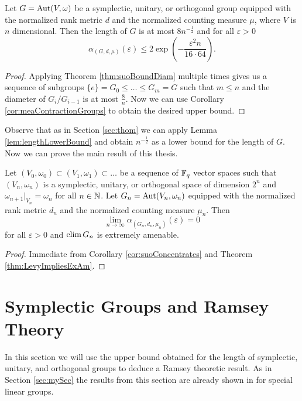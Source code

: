 \begin{corollary}\label{cor:suoConcentrates}
	Let $G=\operatorname{Aut}(V,\omega)$ be a symplectic, unitary, or orthogonal group equipped with the normalized rank metric $d$ and the normalized counting measure $\mu$, where $V$ is $n$ dimensional. Then the length of $G$ is at most $8n^{-\frac{1}{2}}$ and for all $\varepsilon>0$
	\[\alpha_{(G,d,\mu)}(\varepsilon)\leq 2\exp\left(-\frac{\varepsilon^2n}{16\cdot64}\right).\]
\end{corollary}
\begin{proof}
	Applying Theorem \ref{thm:suoBoundDiam} multiple times gives us a sequence of subgroups $\{e\}=G_0\leq \dots\leq G_m=G$ such that $m\leq n$ and the diameter of $G_i/G_{i-1}$ is at most $\frac{8}{n}$. Now we can use Corollary \ref{cor:meaContractionGroups} to obtain the desired upper bound.
\end{proof}
Observe that as in Section \ref{sec:thom} we can apply Lemma \ref{lem:lengthLowerBound} and obtain $n^{-\frac{1}{2}}$ as a lower bound for the length of $G$.
Now we can prove the main result of this thesis.
\begin{corollary}
	Let $(V_0,\omega_0)\subset (V_1,\omega_1)\subset \dots$ be a sequence of $\mathbb{F}_q$ vector spaces such that $(V_n,\omega_n)$ is a symplectic, unitary, or orthogonal space of dimension $2^n$ and $\omega_{n+1}|_{V_n}=\omega_n$ for all $n\in\mathbb{N}$. Let $G_{n}=\operatorname{Aut}(V_n,\omega_n)$ equipped with the normalized rank metric $d_n$ and the normalized counting measure $\mu_n$. 
	Then \[\lim_{n\to\infty}\alpha_{(G_n,d_n,\mu_n)}(\varepsilon)=0\] for all $\varepsilon>0$ and $\operatorname{clim} G_n$ is extremely amenable.
\end{corollary}
\begin{proof}
	Immediate from Corollary \ref{cor:suoConcentrates} and Theorem \ref{thm:LevyImpliesExAm}.
\end{proof}
		
\section{Symplectic Groups and Ramsey Theory}\label{sec:ramsey}
In this section we will use the upper bound obtained for the length of symplectic, unitary, and orthogonal groups to deduce a Ramsey theoretic result. %
As in Section \ref{sec:mySec} the results from this section are already shown in \cite{thom} for special linear groups. 
		
